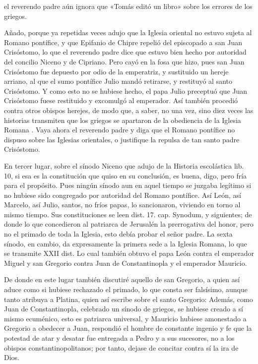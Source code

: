 el reverendo padre aún ignora que «Tomás editó un libro» sobre los errores de los griegos.

Añado, porque ya repetidas veces adujo que la Iglesia oriental no estuvo sujeta al Romano pontífice, y que Epifanio de Chipre repelió del episcopado a san Juan Crisóstomo, lo que el reverendo padre dice que estuvo bien hecho por autoridad del concilio Niceno y de Cipriano. Pero cayó en la fosa que hizo, pues san Juan Crisóstomo fue depuesto por odio de la emperatriz, y sustituido un hereje arriano, al que el sumo pontífice Julio mandó retirarse, y restituyó al santo Crisóstomo. Y como esto no se hubiese hecho, el papa Julio preceptuó que Juan Crisóstomo fuese restituido y excomulgó al emperador. Así también procedió contra otros obispos herejes, de modo que, a saber, no una vez, sino diez veces las historias transmiten que los griegos se apartaron de la obediencia de la Iglesia Romana \marginpar{\small[291]}. Vaya ahora el reverendo padre y diga que el Romano pontífice no dispuso sobre las Iglesias orientales, o justifique la repulsa de tan santo padre Crisóstomo.

En tercer lugar, sobre el sínodo Niceno que adujo de la Historia escolástica lib. 10, si esa es la constitución que quiso en su conclusión, es buena, digo, pero fría para el propósito. Pues ningún sínodo aun en aquel tiempo se juzgaba legítimo si no hubiese sido congregado por autoridad del Romano pontífice. Así León, así Marcelo, así Julio, santos, no fríos papas, lo sancionaron, viviendo en torno al mismo tiempo. Sus constituciones se leen dist. 17. cap. Synodum, y siguientes; de donde lo que concedieron al patriarca de Jerusalén la prerrogativa del honor, pero no el primado de toda la Iglesia, esto debía probar el señor padre. La sexta sínodo, en cambio, da expresamente la primera sede a la Iglesia Romana, lo que se transmite XXII dist. Lo cual también obtuvo el papa León contra el emperador Miguel y san Gregorio contra Juan de Constantinopla y el emperador Mauricio.

De donde en este lugar también discutiré aquello de san Gregorio, a quien así aduce como si hubiese rechazado el primado, lo que consta ser falsísimo, aunque tanto atribuya a Platina, quien así escribe sobre el santo Gregorio: Además, como Juan de Constantinopla, celebrado un sínodo de griegos, se hubiese creado a sí mismo ecuménico, esto es patriarca universal, y Mauricio hubiese amonestado a Gregorio a obedecer a Juan, respondió el hombre de constante ingenio y fe que la potestad de atar y desatar fue entregada a Pedro y a sus sucesores, no a los obispos constantinopolitanos; por tanto, dejase de concitar contra sí la ira de Dios.

